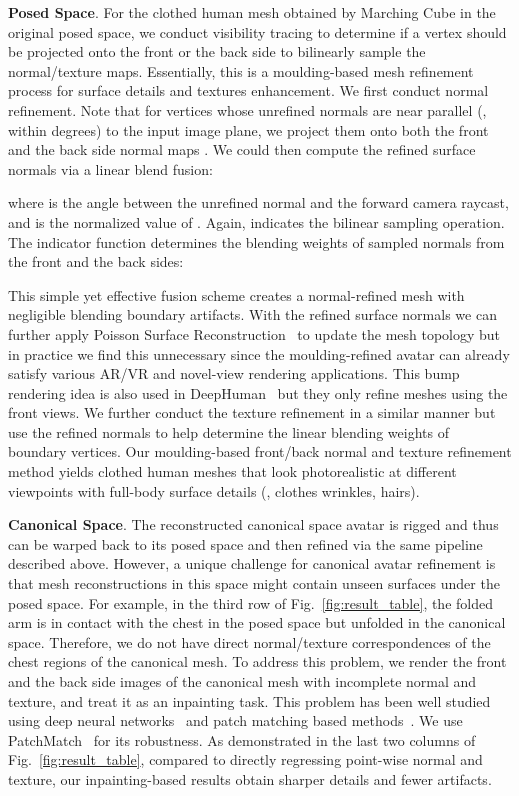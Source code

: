 \documentclass[10pt,twocolumn,letterpaper]{article}
\begin{document}
\textbf{Posed Space}. For the clothed human mesh obtained by Marching Cube in the original posed space, we conduct visibility tracing to determine if a vertex  should be projected onto the front or the back side to bilinearly sample the normal/texture maps. Essentially, this is a moulding-based mesh refinement process for surface details and textures enhancement. We first conduct normal refinement. Note that for vertices whose unrefined normals  are near parallel (\ie, within  degrees) to the input image plane,
we project them onto both the front and the back side normal maps . We could then compute the refined surface normals  via a linear blend fusion:

where  is the angle between the unrefined normal and the forward camera raycast, and  is the normalized value of . Again,  indicates the bilinear sampling operation. The indicator function  determines the blending weights of sampled normals from the front and the back sides:


This simple yet effective fusion scheme creates a normal-refined mesh with negligible blending boundary artifacts. With the refined surface normals we can further apply Poisson Surface Reconstruction~\cite{2013possion_recon} to update the mesh topology but in practice we find this unnecessary since the moulding-refined avatar can already satisfy various AR/VR and novel-view rendering applications. This bump rendering idea is also used in DeepHuman~\cite{DeepHumanICCV19} but they only refine meshes using the front views.
We further conduct the texture refinement in a similar manner but use the refined normals to help determine the linear blending weights of boundary vertices. Our moulding-based front/back normal and texture refinement method yields clothed human meshes that look photorealistic at different viewpoints with full-body surface details (\eg, clothes wrinkles, hairs).

\textbf{Canonical Space}. The reconstructed canonical space avatar is rigged and thus can be warped back to its posed space and then refined via the same pipeline described above. However, a unique challenge for canonical avatar refinement is that mesh reconstructions in this space might contain unseen surfaces under the posed space.
For example, in the third row of Fig.~\ref{fig:result_table}, the folded arm is in contact with the chest in the posed space but unfolded in the canonical space. Therefore, we do not have direct normal/texture correspondences of the chest regions of the canonical mesh. 
To address this problem, we render the front and the back side images of the canonical mesh with incomplete normal and texture, and treat it as an inpainting task. This problem has been well studied using deep neural networks~\cite{yi2020contextual,yu2018generative} and patch matching based methods~\cite{bertalmio2000image,barnes2009patchmatch,huang2014image}. We use PatchMatch~\cite{barnes2009patchmatch} for its robustness. As demonstrated in the last two columns of Fig.~\ref{fig:result_table}, compared to directly regressing point-wise normal and texture, our inpainting-based results obtain sharper details and fewer artifacts.
\end{document}
